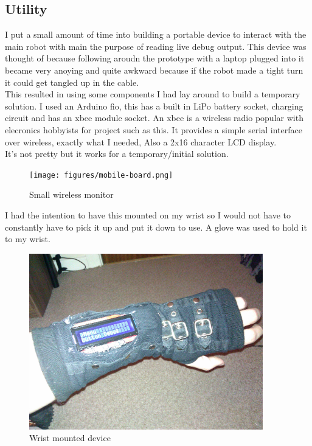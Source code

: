 \documentclass[11pt,fleqn,twoside]{article}
\begin{document}
\subsection{Utility}
I put a small amount of time into building a portable device to interact with the main robot with main the purpose of reading live debug output.  This device was thought of because following aroudn the prototype with a laptop plugged into it became very anoying and quite awkward because if the robot made a tight turn it could get tangled up in the cable.
\\This resulted in using some components I had lay around to build a temporary solution.  I used an Arduino fio, this has a built in LiPo battery socket, charging circuit and has an xbee module socket.  An xbee is a wireless radio popular with elecronics hobbyists for project such as this.  It provides a simple serial interface over wireless, exactly what I needed, Also a 2x16 character LCD display.
\\It's not pretty but it works for a temporary/initial solution.
\begin{figure}[h]
\centering
        \texttt{[image: figures/mobile-board.png]}
        \caption{Small wireless monitor}
        \label{Small wireless monitor}
\end{figure}
I had the intention to have this mounted on my wrist so I would not have to constantly have to pick it up and put it down to use.  A glove was used to hold it to my wrist.
\begin{figure}[h]
\centering
        \includegraphics[width=4.0in] {figures/wrist-device.jpg}
        \caption{Wrist mounted device}
        \label{Wrist mounted device}
\end{figure}

\end{document}
